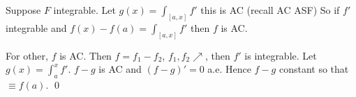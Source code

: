 \pf Suppose $F$ integrable. Let $g(x)= \int_{[a,x]} f'$ this is AC (recall AC ASF) So if $f'$ integrable and $f(x)- f(a) = \int_{[a,x]} f'$ then $f$ is AC.

For other, $f$ is AC. Then $f= f_1-f_2$, $f_1,f_2 \nearrow$, then $f'$ is integrable. Let $g(x) = \int_a^x f'$. $f-g$ is AC and $(f-g)'=0$ a.e. Hence $f-g$ constant so that $\equiv f(a)$. \qed \\






















